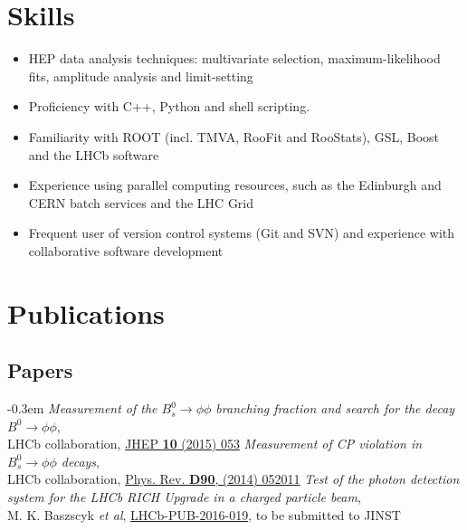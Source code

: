 \documentclass[contbibnum,titleabove]{simplecv}
\begin{document}
	\section{Skills}
	\vspace{0.5em}
	\begin{itemize}
		\item HEP data analysis techniques: multivariate selection, maximum-likelihood fits, amplitude analysis and limit-setting
		\item Proficiency with C++, Python and shell scripting.
		\item Familiarity with ROOT (incl. TMVA, RooFit and RooStats), GSL, Boost and the LHCb software
		\item Experience using parallel computing resources, such as the Edinburgh and CERN batch services and the LHC Grid
		\item Frequent user of version control systems (Git and SVN) and experience with collaborative software development
	\end{itemize}
	\section{Publications}
	\vspace{0.5em}
	\renewcommand{\topicmargin}{5em}
	\subsection{Papers}
	\begin{thebibliography}{1}
		\itemsep-0.3em
		\textit{Measurement of the $B^0_s \to \phi\phi$ branching fraction and search for the decay $B^0 \to \phi \phi$},\\LHCb collaboration, \href{http://dx.doi.org/10.1007/JHEP10(2015)053}{JHEP \textbf{10} (2015) 053}
		\textit{Measurement of CP violation in $B^0_s \to \phi\phi$ decays},\\LHCb collaboration, \href{http://dx.doi.org/10.1103/PhysRevD.90.052011}{Phys. Rev. \textbf{D90}, (2014) 052011}
		\textit{Test of the photon detection system for the LHCb RICH Upgrade in a charged particle beam},\\M. K. Baszscyk \textit{et al}, \href{http://cds.cern.ch/record/2197586}{LHCb-PUB-2016-019}, to be submitted to JINST
	\end{thebibliography}
\end{document}
